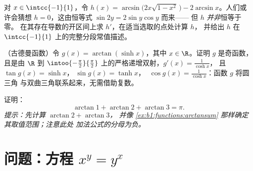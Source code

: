 \begin{exercise}[$\star\star\star$]\label{exo:b1:functions:10}
对 $x \in \intcc{-1}{1}$，令
$h(x) = \arcsin\bigl(2x\sqrt{1 - x^2}\,\bigr) - 2\arcsin x$。人们或许会猜想
$h = 0$，这由恒等式 $\sin 2y = 2\sin y\cos y$ 而来——
但 $h$ \emph{并非}恒等于零。
在其存在导数的开区间上求 $h'$，在适当选取的点处计算 $h$，
并给出 $h$ 在 $\intcc{-1}{1}$ 上的完整分段常值描述。
\end{exercise}

\begin{exercise}[$\star\star\star$]\label{exo:b1:functions:11}
（古德曼函数）令 $g(x) = \arctan(\sinh x)$，其中 $x \in \R$。证明
$g$ 是奇函数，且是由 $\R$ 到
$\intoo{-\frac\pi2}{\frac\pi2}$ 上的严格递增双射，$g'(x) = \frac{1}{\cosh x}$，
且 $\tan g(x) = \sinh x$，$\;\sin g(x) = \tanh x$，
$\;\cos g(x) = \frac{1}{\cosh x}$：函数 $g$ 将圆三角
与双曲三角联系起来，无需借助复数。
\end{exercise}

\begin{exercise}[$\star\star$]\label{exo:b1:functions:12}
证明：
\[
\arctan 1 + \arctan 2 + \arctan 3 = \pi .
\]
\emph{提示：先计算 $\arctan 2 + \arctan 3$，
并像 \cref{ex:b1:functions:arctansum} 那样确定其取值范围；注意此处
加法公式的分母为负。}
\end{exercise}

\section{问题：方程 $x^y = y^x$}

